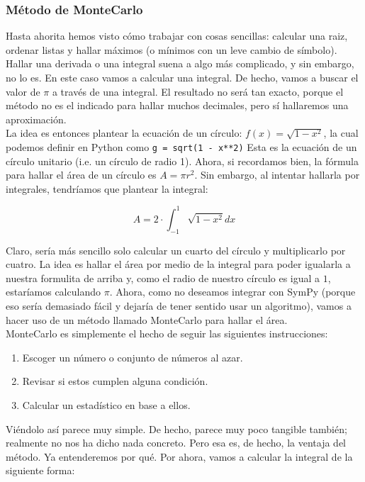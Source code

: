 \documentclass[10pt,letterpaper]{article}
\newcommand{\inlinecode}[1]{
\colorbox{light-gray}{\texttt{#1}}
}
\begin{document}
\subsubsection{M\'etodo de MonteCarlo}
Hasta ahorita hemos visto c\'omo trabajar con cosas sencillas: calcular una raiz, ordenar listas y hallar m\'aximos (o m\'inimos con un leve cambio de s\'imbolo). Hallar una derivada o una integral suena a algo m\'as complicado, y sin embargo, no lo es. En este caso vamos a calcular una integral. De hecho, vamos a buscar el valor de $\pi$ a trav\'es de una integral. El resultado no ser\'a tan exacto, porque el m\'etodo no es el indicado para hallar muchos decimales, pero s\'i hallaremos una aproximaci\'on.\\

La idea es entonces plantear la ecuaci\'on de un c\'irculo: $f\! \left(x\right) = \sqrt{1 - x^2}$, la cual podemos definir en Python como \inlinecode{g = sqrt(1 - x**2)} Esta es la ecuaci\'on de un c\'irculo unitario (i.e. un c\'irculo de radio 1). Ahora, si recordamos bien, la f\'ormula para hallar el \'area de un c\'irculo es $A = \pi r^2$. Sin embargo, al intentar hallarla por integrales, tendr\'iamos que plantear la integral:

\begin{equation}
A = 2 \cdot \int_{-1}^{1} \sqrt{1 - x^2}  dx
\end{equation}

Claro, ser\'ia m\'as sencillo solo calcular un cuarto del c\'irculo y multiplicarlo por cuatro. La idea es hallar el \'area por medio de la integral para poder igualarla a nuestra formulita de arriba y, como el radio de nuestro c\'irculo es igual a $1$, estar\'iamos calculando $\pi$. Ahora, como no deseamos integrar con SymPy (porque eso ser\'ia demasiado f\'acil y dejar\'ia de tener sentido usar un algoritmo), vamos a hacer uso de un m\'etodo llamado MonteCarlo para hallar el \'area.\\

MonteCarlo es simplemente el hecho de seguir las siguientes instrucciones:

\begin{enumerate}
\item Escoger un n\'umero o conjunto de n\'umeros al azar.
\item Revisar si estos cumplen alguna condici\'on.
\item Calcular un estad\'istico en base a ellos.
\end{enumerate}

Vi\'endolo as\'i parece muy simple. De hecho, parece muy poco tangible tambi\'en; realmente no nos ha dicho nada concreto. Pero esa es, de hecho, la ventaja del m\'etodo. Ya entenderemos por qu\'e. Por ahora, vamos a calcular la integral de la siguiente forma:
\end{document}
